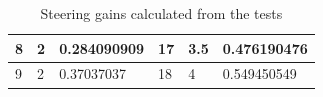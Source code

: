 \begin{table}[H]
\begin{tabular}{|p{2cm}|p{2cm}|p{3cm}|p{2cm}|p{2cm}|p{3cm}|}
\hline%
           8    &   2   &   0.284090909   &    17   &            3.5     &           0.476190476              \\
\hline%
           9    &   2   &   0.37037037    &    18    &           4       &         0.549450549                \\
\hline%
\end{tabular}
\caption{Steering gains calculated from the tests}
\label{tab:steeringGains}
\end{table}

